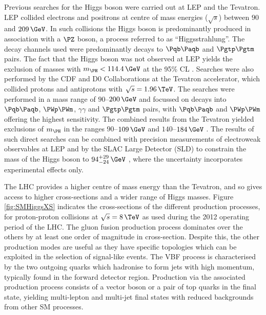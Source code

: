 Previous searches for the Higgs boson were carried out at LEP and the
Tevatron. LEP collided electrons and positrons at centre of mass
energies ($\sqrt{s}$) between $90$ and $209\,\GeV$. In such collisions the Higgs
boson is predominantly produced in association with a $\PZ$ boson, a process
referred to as ``Higgsstrahlung''. The decay channels used were predominantly decays
to $\Pqb\Paqb$ and $\Pgtp\Pgtm$ pairs. The fact that the Higgs boson was not
observed at LEP yields the exclusion of masses with $m_{\PH}<114.4\,\GeV$ at the
95\% \ac{CL} \cite{Barate:2003sz}. Searches were also performed by the CDF and D0 Collaborations at
the Tevatron accelerator, which collided protons and antiprotons with
$\sqrt{s}=1.96\,\TeV$. The searches were performed in a mass range of
$90$--$200\,\GeV$ and focussed on decays into $\Pqb\Paqb$, $\PWp\PWm$,
$\gamma\gamma$ and $\Pgtp\Pgtm$ pairs, with  $\Pqb\Paqb$ and $\PWp\PWm$ offering
the highest sensitivity. The combined results from the Tevatron yielded
exclusions of $m_{\PH}$ in the ranges $90$--$109\,\GeV$ and $140$--$184\,\GeV$
\cite{Aaltonen:2013kxa}. The results of such direct searches
can be combined with precision measurements of electroweak observables at LEP
and by the SLAC Large Detector (SLD) to constrain the mass of the Higgs
boson to $94^{+29}_{-24}\,\GeV$ \cite{lepewwg}, 
where the uncertainty incorporates experimental effects only.

The LHC provides a higher centre of mass energy than the Tevatron, and so
gives access to higher cross-sections and a wider range of Higgs masses. Figure
\ref{fig:SMHiggsXS} indicates the cross-sections of the different production
processes, for proton-proton collisions at $\sqrt{s}=8\,\TeV$ as used during the 
2012 operating period of the LHC. The gluon fusion production process dominates 
over the others by at least one order of magnitude in cross-section. 
Despite this, the other production modes are useful as they have specific 
topologies which can be exploited in the selection of signal-like events. 
The \ac{VBF} process is characterised by the two outgoing quarks which
hadronise to form jets with high momentum, typically found in the forward
detector region. Production via the associated production process consists of a vector
boson or a pair of top quarks in the final state, yielding multi-lepton and 
multi-jet final states with reduced backgrounds from other \ac{SM} processes.

